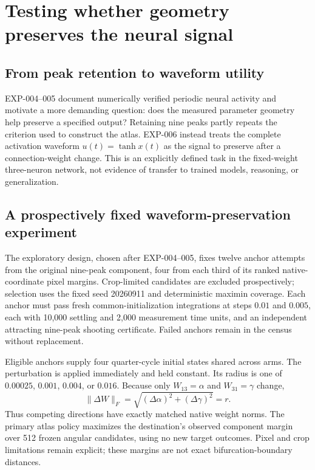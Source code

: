 \section{Testing whether geometry preserves the neural signal}
\subsection{From peak retention to waveform utility}
EXP-004--005 document numerically verified periodic neural activity and motivate a more demanding question: does the measured parameter geometry help preserve a specified output? Retaining nine peaks partly repeats the criterion used to construct the atlas. EXP-006 instead treats the complete activation waveform $u(t)=\tanh x(t)$ as the signal to preserve after a connection-weight change. This is an explicitly defined task in the fixed-weight three-neuron network, not evidence of transfer to trained models, reasoning, or generalization.

\subsection{A prospectively fixed waveform-preservation experiment}
The exploratory design, chosen after EXP-004--005, fixes twelve anchor attempts from the original nine-peak component, four from each third of its ranked native-coordinate pixel margins. Crop-limited candidates are excluded prospectively; selection uses the fixed seed 20260911 and deterministic maximin coverage. Each anchor must pass fresh common-initialization integrations at steps $0.01$ and $0.005$, each with 10,000 settling and 2,000 measurement time units, and an independent attracting nine-peak shooting certificate. Failed anchors remain in the census without replacement.

Eligible anchors supply four quarter-cycle initial states shared across arms. The perturbation is applied immediately and held constant. Its radius is one of $0.00025$, $0.001$, $0.004$, or $0.016$. Because only $W_{13}=\alpha$ and $W_{31}=\gamma$ change,
\begin{equation}
 \|\Delta W\|_F=\sqrt{(\Delta\alpha)^2+(\Delta\gamma)^2}=r.
\end{equation}
Thus competing directions have exactly matched native weight norms. The primary atlas policy maximizes the destination's observed component margin over 512 frozen angular candidates, using no new target outcomes. Pixel and crop limitations remain explicit; these margins are not exact bifurcation-boundary distances.

